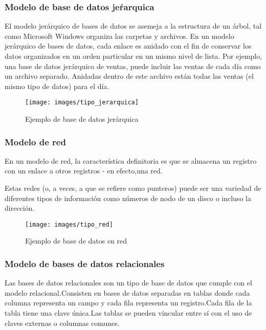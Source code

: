 \subsubsection*{Modelo de base de datos jeŕarquica}

El modelo jerárquico de bases de datos se asemeja a la estructura de un árbol, tal como Microsoft Windows organiza las carpetas y archivos. En un modelo jerárquico de bases de datos, cada enlace es anidado con el fin de conservar los datos organizados en un orden particular en un mismo nivel de lista. Por ejemplo, una base de datos jerárquico de ventas, puede incluir las ventas de cada día como un archivo separado. Anidadas dentro de este archivo están todas las ventas (el mismo tipo de datos) para el día.

\begin{figure}[!h]
	\centering
	\texttt{[image: images/tipo\_jerarquica]}
	\caption{Ejemplo de base de datos jerárquica}
	\label{fig:bd_jerarquica}
\end{figure}

\subsubsection*{Modelo de red}

En un modelo de red, la característica definitoria es que se almacena un registro con un enlace a otros registros - en efecto,una red.

Estas redes (o, a veces, a que se refiere como punteros) puede ser una variedad de diferentes tipos de información como números de nodo de un disco o incluso la dirección. 

\begin{figure}[!h]
	\centering
	\texttt{[image: images/tipo\_red]}
	\caption{Ejemplo de base de datos en red}
	\label{fig:bd_red}
\end{figure}

\subsubsection*{Modelo de bases de datos relacionales}

Las  bases  de  datos  relacionales son un  tipo  de  base  de  datos  que  cumple  con  el  modelo relacional.Consisten en bases de datos separadas en tablas donde cada columna representa un campo y cada fila representa un registro.Cada fila de la tabla tiene una clave única.Las tablas se pueden vincular entre sí con el uso de claves externas o columnas comunes.


